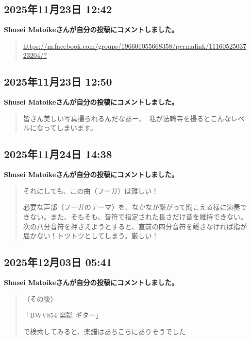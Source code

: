 \subsection*{2025年11月23日 12:42}

\textbf{Shusei Matoikeさんが自分の投稿にコメントしました。}

\begin{quote}
\url{https://m.facebook.com/groups/196601055668358/permalink/1116052503723204/?}
\end{quote}

\subsection*{2025年11月23日 12:50}

\textbf{Shusei Matoikeさんが自分の投稿にコメントしました。}

\begin{quote}
皆さん美しい写真撮られるんだなあー、😮‍💨私が法輪寺を撮るとこんなレベルになってしまいます。
\end{quote}

\subsection*{2025年11月24日 14:38}

\textbf{Shusei Matoikeさんが自分の投稿にコメントしました。}

\begin{quote}
それにしても、この曲（フーガ）は難しい！

必要な声部（フーガのテーマ）を、なかなか繋がって聞こえる様に演奏できない。また、そもそも、音符で指定された長さだけ音を維持できない。次の八分音符を押さえようとすると、直前の四分音符を離さなければ指が届かない！トツトツとしてしまう。厳しい！
\end{quote}

\subsection*{2025年12月03日 05:41}

\textbf{Shusei Matoikeさんが自分の投稿にコメントしました。}

\begin{quote}
（その後）

「BWV854 楽譜 ギター」

で検索してみると、楽譜はあちこちにありそうでした
\end{quote}

